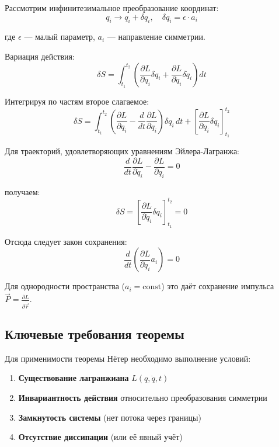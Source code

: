 \documentclass[a4paper,12pt]{article}
\begin{document}
Рассмотрим инфинитезимальное преобразование координат:
\begin{equation}
q_i \to q_i + \delta q_i, \quad \delta q_i = \epsilon \cdot a_i
\label{eq:infinitesimal_transform}
\end{equation}

где $\epsilon$ --- малый параметр, $a_i$ --- направление симметрии.

Вариация действия:
\begin{equation}
\delta S = \int_{t_1}^{t_2} \left(\frac{\partial L}{\partial q_i}\delta q_i +
\frac{\partial L}{\partial \dot{q}_i}\delta\dot{q}_i\right) dt
\label{eq:action_variation}
\end{equation}

Интегрируя по частям второе слагаемое:
\begin{equation}
\delta S = \int_{t_1}^{t_2} \left(\frac{\partial L}{\partial q_i} -
\frac{d}{dt}\frac{\partial L}{\partial \dot{q}_i}\right)\delta q_i \, dt +
\left[\frac{\partial L}{\partial \dot{q}_i}\delta q_i\right]_{t_1}^{t_2}
\label{eq:action_variation_parts}
\end{equation}

Для траекторий, удовлетворяющих уравнениям Эйлера-Лагранжа:
\begin{equation}
\frac{d}{dt}\frac{\partial L}{\partial \dot{q}_i} - \frac{\partial L}{\partial q_i} = 0
\label{eq:euler_lagrange}
\end{equation}

получаем:
\begin{equation}
\delta S = \left[\frac{\partial L}{\partial \dot{q}_i}\delta q_i\right]_{t_1}^{t_2} = 0
\label{eq:action_variation_final}
\end{equation}

Отсюда следует закон сохранения:
\begin{equation}
\boxed{\frac{d}{dt}\left(\frac{\partial L}{\partial \dot{q}_i} a_i\right) = 0}
\label{eq:noether_conservation}
\end{equation}

Для однородности пространства ($a_i = \text{const}$) это даёт сохранение
импульса $\vec{P} = \frac{\partial L}{\partial \dot{\vec{r}}}$.

\subsection{Ключевые требования теоремы}

Для применимости теоремы Нётер необходимо выполнение условий:
\begin{enumerate}
    \item \textbf{Существование лагранжиана} $L(q, \dot{q}, t)$
    \item \textbf{Инвариантность действия} относительно преобразования симметрии
    \item \textbf{Замкнутость системы} (нет потока через границы)
    \item \textbf{Отсутствие диссипации} (или её явный учёт)
\end{enumerate}
\end{document}
